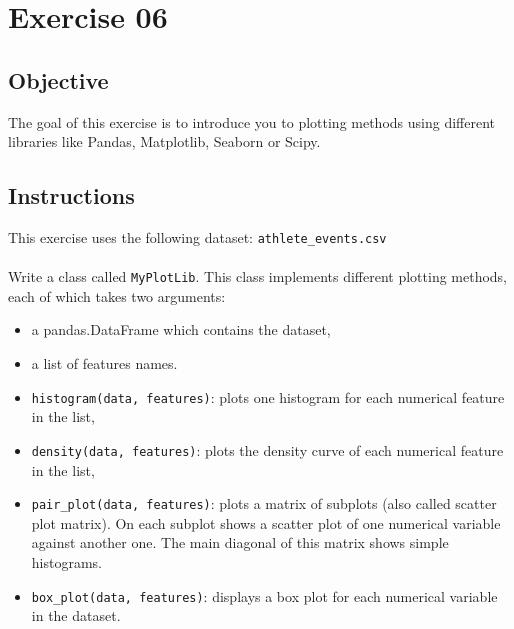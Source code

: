 \chapter{Exercise 06}
\makeheaderfilesforbidden

\section*{Objective}
The goal of this exercise is to introduce you to plotting methods using different
libraries like Pandas, Matplotlib, Seaborn or Scipy.

\section*{Instructions}
This exercise uses the following dataset: \texttt{athlete\_events.csv}\\
\\
Write a class called \texttt{MyPlotLib}. This class implements different plotting
methods, each of which takes two arguments:
\begin{itemize}
  \item a pandas.DataFrame which contains the dataset,
  \item a list of features names.
\end{itemize}


\begin{itemize}
  \item \texttt{histogram(data, features)}: plots one histogram for each numerical feature in the list,
  \item \texttt{density(data, features)}: plots the density curve of each numerical feature in the list,
  \item \texttt{pair\_plot(data, features)}: plots a matrix of subplots (also called scatter plot matrix).
        On each subplot shows a scatter plot of one numerical variable against another one.
        The main diagonal of this matrix shows simple histograms.
  \item \texttt{box\_plot(data, features)}: displays a box plot for each numerical variable in the dataset.
\end{itemize}

